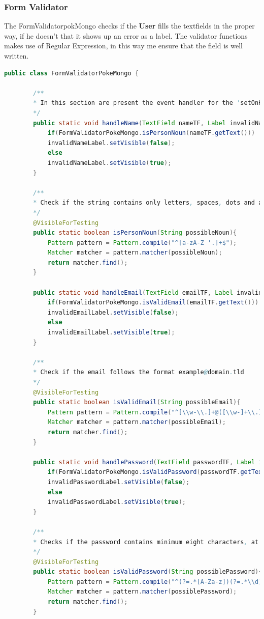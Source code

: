 \subsubsection{Form Validator}
The FormValidatorpokMongo checks if the \textbf{User} fills the textfields in the proper way, if he doesn’t that it shows up an error as a label. The validator functions makes use of Regular Expression, in this way me ensure that the field is well written.
\begin{lstlisting}[language=Java]
	public class FormValidatorPokeMongo {
		
		/**
		* In this section are present the event handler for the 'setOnKeyReleased' event in the form.
		*/
		public static void handleName(TextField nameTF, Label invalidNameLabel){
			if(FormValidatorPokeMongo.isPersonNoun(nameTF.getText()))
			invalidNameLabel.setVisible(false);
			else
			invalidNameLabel.setVisible(true);
		}
		
		/**
		* Check if the string contains only letters, spaces, dots and apostrophes.
		*/
		@VisibleForTesting
		public static boolean isPersonNoun(String possibleNoun){
			Pattern pattern = Pattern.compile("^[a-zA-Z '.]+$");
			Matcher matcher = pattern.matcher(possibleNoun);
			return matcher.find();
		}
		
		public static void handleEmail(TextField emailTF, Label invalidEmailLabel){
			if(FormValidatorPokeMongo.isValidEmail(emailTF.getText()))
			invalidEmailLabel.setVisible(false);
			else
			invalidEmailLabel.setVisible(true);
		}
		
		/**
		* Check if the email follows the format example@domain.tld
		*/
		@VisibleForTesting
		public static boolean isValidEmail(String possibleEmail){
			Pattern pattern = Pattern.compile("^[\\w-\\.]+@([\\w-]+\\.)+[\\w-]{2,4}$");
			Matcher matcher = pattern.matcher(possibleEmail);
			return matcher.find();
		}
		
		public static void handlePassword(TextField passwordTF, Label invalidPasswordLabel){
			if(FormValidatorPokeMongo.isValidPassword(passwordTF.getText()))
			invalidPasswordLabel.setVisible(false);
			else
			invalidPasswordLabel.setVisible(true);
		}
		
		/**
		* Checks if the password contains minimum eight characters, at least one letter and one number.
		*/
		@VisibleForTesting
		public static boolean isValidPassword(String possiblePassword){
			Pattern pattern = Pattern.compile("^(?=.*[A-Za-z])(?=.*\\d)[A-Za-z\\d]{8,}$");
			Matcher matcher = pattern.matcher(possiblePassword);
			return matcher.find();
		}
		

\end{lstlisting}
